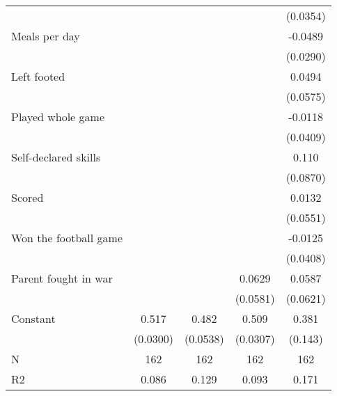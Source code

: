 {\begin{tabular}{l*{4}{c}}
                    &                     &                     &                     &    (0.0354)         \\
[1em]
Meals per day       &                     &                     &                     &     -0.0489\sym{*}  \\
                    &                     &                     &                     &    (0.0290)         \\
[1em]
Left footed         &                     &                     &                     &      0.0494         \\
                    &                     &                     &                     &    (0.0575)         \\
[1em]
Played whole game   &                     &                     &                     &     -0.0118         \\
                    &                     &                     &                     &    (0.0409)         \\
[1em]
Self-declared skills&                     &                     &                     &       0.110         \\
                    &                     &                     &                     &    (0.0870)         \\
[1em]
Scored              &                     &                     &                     &      0.0132         \\
                    &                     &                     &                     &    (0.0551)         \\
[1em]
Won the football game&                     &                     &                     &     -0.0125         \\
                    &                     &                     &                     &    (0.0408)         \\
[1em]
Parent fought in war&                     &                     &      0.0629         &      0.0587         \\
                    &                     &                     &    (0.0581)         &    (0.0621)         \\
[1em]
Constant            &       0.517\sym{***}&       0.482\sym{***}&       0.509\sym{***}&       0.381\sym{***}\\
                    &    (0.0300)         &    (0.0538)         &    (0.0307)         &     (0.143)         \\
\hline
N                   &         162         &         162         &         162         &         162         \\
R2                  &       0.086         &       0.129         &       0.093         &       0.171         \\
\hline\hline
\end{tabular}
}
